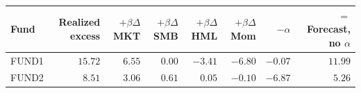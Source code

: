 \begin{tabular}{lrrrrrrr}
\toprule
Fund & Realized excess & $+\beta\Delta$MKT & $+\beta\Delta$SMB & $+\beta\Delta$HML & $+\beta\Delta$Mom & $-\alpha$ & $=$ Forecast, no $\alpha$ \\
\midrule
FUND1 & $15.72$ & $6.55$ & $0.00$ & $-3.41$ & $-6.80$ & $-0.07$ & $11.99$ \\
FUND2 & $8.51$ & $3.06$ & $0.61$ & $0.05$ & $-0.10$ & $-6.87$ & $5.26$ \\
\bottomrule
\end{tabular}
